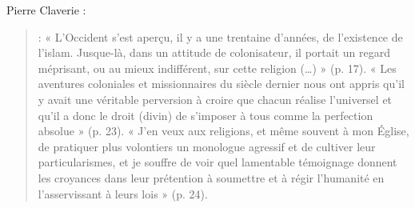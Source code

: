 Pierre Claverie  :
\begin{quote}
   :  « L’Occident s’est aperçu, il y a une trentaine d’années, de l’existence de l’islam.  Jusque-là, dans un attitude de colonisateur, il portait un regard méprisant, ou au mieux indifférent, sur cette religion (…) » (p. 17). « Les aventures coloniales et missionnaires du siècle dernier nous ont appris qu’il y avait une véritable perversion à croire que chacun réalise l’universel et qu’il a donc le droit (divin) de s’imposer à tous comme la perfection absolue » (p. 23).  « J’en veux aux religions, et même souvent à mon Église, de pratiquer plus volontiers un monologue agressif et de cultiver leur particularismes, et je souffre de voir quel lamentable témoignage donnent les croyances dans leur prétention à soumettre et à régir l’humanité en l’asservissant à leurs lois » (p. 24). 
\end{quote}